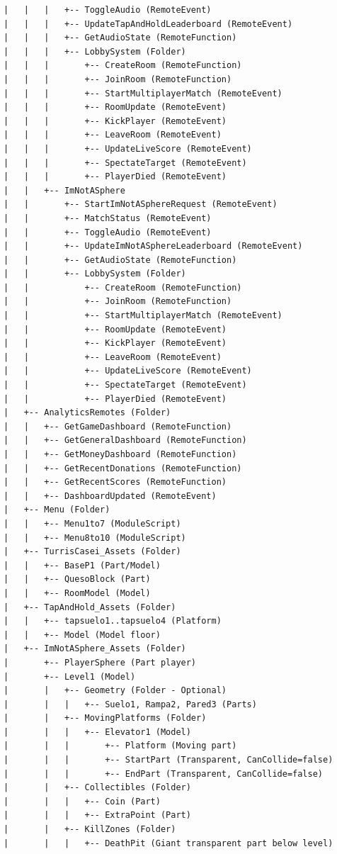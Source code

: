 \documentclass[12pt,letterpaper]{article}
\begin{document}
\begin{lstlisting}
|   |   |   +-- ToggleAudio (RemoteEvent)
|   |   |   +-- UpdateTapAndHoldLeaderboard (RemoteEvent)
|   |   |   +-- GetAudioState (RemoteFunction)
|   |   |   +-- LobbySystem (Folder)
|   |   |       +-- CreateRoom (RemoteFunction)
|   |   |       +-- JoinRoom (RemoteFunction)
|   |   |       +-- StartMultiplayerMatch (RemoteEvent)
|   |   |       +-- RoomUpdate (RemoteEvent)
|   |   |       +-- KickPlayer (RemoteEvent)
|   |   |       +-- LeaveRoom (RemoteEvent)
|   |   |       +-- UpdateLiveScore (RemoteEvent)
|   |   |       +-- SpectateTarget (RemoteEvent)
|   |   |       +-- PlayerDied (RemoteEvent)
|   |   +-- ImNotASphere
|   |       +-- StartImNotASphereRequest (RemoteEvent)
|   |       +-- MatchStatus (RemoteEvent)
|   |       +-- ToggleAudio (RemoteEvent)
|   |       +-- UpdateImNotASphereLeaderboard (RemoteEvent)
|   |       +-- GetAudioState (RemoteFunction)
|   |       +-- LobbySystem (Folder)
|   |           +-- CreateRoom (RemoteFunction)
|   |           +-- JoinRoom (RemoteFunction)
|   |           +-- StartMultiplayerMatch (RemoteEvent)
|   |           +-- RoomUpdate (RemoteEvent)
|   |           +-- KickPlayer (RemoteEvent)
|   |           +-- LeaveRoom (RemoteEvent)
|   |           +-- UpdateLiveScore (RemoteEvent)
|   |           +-- SpectateTarget (RemoteEvent)
|   |           +-- PlayerDied (RemoteEvent)
|   +-- AnalyticsRemotes (Folder)
|   |   +-- GetGameDashboard (RemoteFunction)
|   |   +-- GetGeneralDashboard (RemoteFunction)
|   |   +-- GetMoneyDashboard (RemoteFunction)
|   |   +-- GetRecentDonations (RemoteFunction)
|   |   +-- GetRecentScores (RemoteFunction)
|   |   +-- DashboardUpdated (RemoteEvent)
|   +-- Menu (Folder)
|   |   +-- Menu1to7 (ModuleScript)
|   |   +-- Menu8to10 (ModuleScript)
|   +-- TurrisCasei_Assets (Folder)
|   |   +-- BaseP1 (Part/Model)
|   |   +-- QuesoBlock (Part)
|   |   +-- RoomModel (Model)
|   +-- TapAndHold_Assets (Folder)
|   |   +-- tapsuelo1..tapsuelo4 (Platform)
|   |   +-- Model (Model floor)
|   +-- ImNotASphere_Assets (Folder)
|       +-- PlayerSphere (Part player)
|       +-- Level1 (Model)
|       |   +-- Geometry (Folder - Optional)
|       |   |   +-- Suelo1, Rampa2, Pared3 (Parts)
|       |   +-- MovingPlatforms (Folder)
|       |   |   +-- Elevator1 (Model)
|       |   |       +-- Platform (Moving part)
|       |   |       +-- StartPart (Transparent, CanCollide=false)
|       |   |       +-- EndPart (Transparent, CanCollide=false)
|       |   +-- Collectibles (Folder)
|       |   |   +-- Coin (Part)
|       |   |   +-- ExtraPoint (Part)
|       |   +-- KillZones (Folder)
|       |   |   +-- DeathPit (Giant transparent part below level)

\end{lstlisting}
\end{document}
